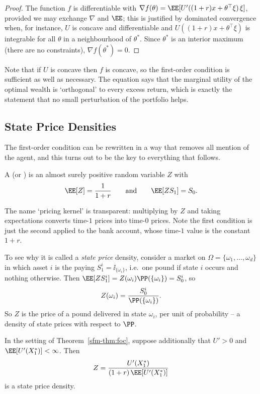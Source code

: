 \begin{proof}
	The function $f$ is differentiable with $\nabla f(\theta) = \EE[U'((1+r)x + \theta^\top\xi)\,\xi]$, provided we may exchange $\nabla$ and $\EE$; this is justified by dominated convergence when, for instance, $U$ is concave and differentiable and $U((1+r)x + \theta^\top \xi)$ is integrable for all $\theta$ in a neighbourhood of $\theta^*$. Since $\theta^*$ is an interior maximum (there are no constraints), $\nabla f(\theta^*) = 0$.
\end{proof}

Note that if $U$ is concave then $f$ is concave, so the first-order condition is sufficient as well as necessary. The equation says that the marginal utility of the optimal wealth is `orthogonal' to every excess return, which is exactly the statement that no small perturbation of the portfolio helps.

\subsection{State Price Densities}

The first-order condition can be rewritten in a way that removes all mention of the agent, and this turns out to be the key to everything that follows.

\begin{definition}
	A  (or ) is an almost surely positive random variable $Z$ with
	$$
	\EE[Z] = \frac{1}{1+r} \qquad \text{and} \qquad \EE[Z S_1] = S_0.
	$$
\end{definition}

The name `pricing kernel' is transparent: multiplying by $Z$ and taking expectations converts time-$1$ prices into time-$0$ prices. Note the first condition is just the second applied to the bank account, whose time-$1$ value is the constant $1 + r$.

To see why it is called a \emph{state price} density, consider a market on $\Omega = \{\omega_1,\dots,\omega_d\}$ in which asset $i$ is the  paying $S_1^i = \ii_{\{\omega_i\}}$, i.e.\ one pound if state $i$ occurs and nothing otherwise. Then $\EE[ZS_1^i] = Z(\omega_i)\PP(\{\omega_i\}) = S_0^i$, so
$$
Z(\omega_i) = \frac{S_0^i}{\PP(\{\omega_i\})}.
$$
So $Z$ is the price of a pound delivered in state $\omega_i$, per unit of probability -- a density of state prices with respect to $\PP$.

\begin{theorem}\label{thm:spd-from-utility}
	In the setting of Theorem~\ref{sfm-thm:foc}, suppose additionally that $U' > 0$ and $\EE[U'(X_1^*)] < \infty$. Then
	$$
	Z = \frac{U'(X_1^*)}{(1+r)\,\EE[U'(X_1^*)]}
	$$
	is a state price density.
\end{theorem}


